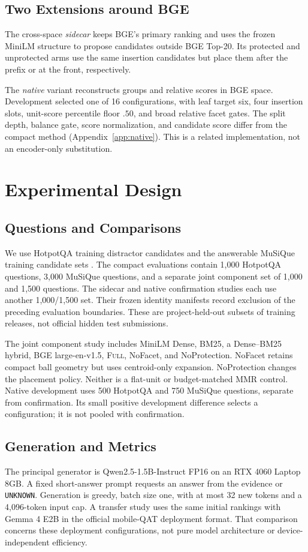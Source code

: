 \documentclass[11pt]{article}
\newcommand{\full}{\textsc{Full}\xspace}
\begin{document}
\subsection{Two Extensions around BGE}
The cross-space \emph{sidecar} keeps BGE's primary ranking and uses the frozen
MiniLM structure to propose candidates outside BGE Top-20. Its protected and
unprotected arms use the same insertion candidates but place them after the
prefix or at the front, respectively.

The \emph{native} variant reconstructs groups and relative scores in BGE
space. Development selected one of 16 configurations, with leaf target six,
four insertion slots, unit-score percentile floor $.50$, and broad relative
facet gates. The split depth, balance gate, score normalization, and candidate
score differ from the compact method (Appendix~\ref{app:native}).
This is a related implementation, not an encoder-only substitution.

\section{Experimental Design}
\subsection{Questions and Comparisons}
We use HotpotQA training distractor candidates and the answerable MuSiQue
training candidate sets \citep{yang2018hotpotqa,trivedi2022musique}.
The compact evaluations contain 1,000 HotpotQA questions, 3,000 MuSiQue
questions, and a separate joint component set of 1,000 and 1,500 questions.
The sidecar and native confirmation studies each use another 1,000/1,500
set. Their frozen identity manifests record exclusion of the preceding
evaluation boundaries. These are project-held-out subsets of training
releases, not official hidden test submissions.

The joint component study includes MiniLM Dense, BM25, a Dense--BM25 hybrid,
BGE large-en-v1.5, \full, NoFacet, and NoProtection.
NoFacet retains compact ball geometry but uses centroid-only expansion.
NoProtection changes the placement policy. Neither is a flat-unit or
budget-matched MMR control.
Native development uses 500 HotpotQA and 750 MuSiQue questions, separate from
confirmation. Its small positive development difference selects a
configuration; it is not pooled with confirmation.

\subsection{Generation and Metrics}
The principal generator is Qwen2.5-1.5B-Instruct FP16 on an RTX 4060 Laptop
8GB. A fixed short-answer prompt requests an answer from the evidence or
\texttt{UNKNOWN}. Generation is greedy, batch size one, with at most 32 new
tokens and a 4,096-token input cap. A transfer study uses the same initial
rankings with Gemma 4 E2B in the official mobile-QAT deployment format.
That comparison concerns these deployment configurations, not pure model
architecture or device-independent efficiency.
\end{document}
